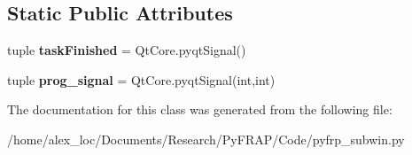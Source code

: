 \subsection*{Static Public Attributes}
\begin{DoxyCompactItemize}
\item 
\hypertarget{classpyfrp__subwin_1_1analyze__all__thread_a7e107c5d6871f05837e5f03c38cbdc69}{tuple {\bfseries task\+Finished} = Qt\+Core.\+pyqt\+Signal()}\label{classpyfrp__subwin_1_1analyze__all__thread_a7e107c5d6871f05837e5f03c38cbdc69}

\item 
\hypertarget{classpyfrp__subwin_1_1analyze__all__thread_a2fa1a91163d761b3c71dafec4e846851}{tuple {\bfseries prog\+\_\+signal} = Qt\+Core.\+pyqt\+Signal(int,int)}\label{classpyfrp__subwin_1_1analyze__all__thread_a2fa1a91163d761b3c71dafec4e846851}

\end{DoxyCompactItemize}


The documentation for this class was generated from the following file\+:\begin{DoxyCompactItemize}
\item 
/home/alex\+\_\+loc/\+Documents/\+Research/\+Py\+F\+R\+A\+P/\+Code/pyfrp\+\_\+subwin.\+py\end{DoxyCompactItemize}
